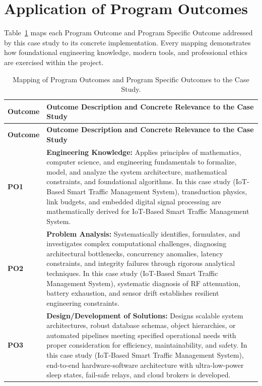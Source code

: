 \section{Application of Program Outcomes}
Table~\ref{tab:po} maps each Program Outcome and Program Specific Outcome addressed by this case study to its concrete implementation. Every mapping demonstrates how foundational engineering knowledge, modern tools, and professional ethics are exercised within the project.

{\small
\begin{longtable}{@{}>{\centering\arraybackslash}p{1.8cm} p{13.2cm}@{}}
    \caption{Mapping of Program Outcomes and Program Specific Outcomes to the Case Study.}\label{tab:po}\\
    \toprule
    \textbf{Outcome} & \textbf{Outcome Description and Concrete Relevance to the Case Study} \\
    \midrule
    \endfirsthead
    \toprule
    \textbf{Outcome} & \textbf{Outcome Description and Concrete Relevance to the Case Study} \\
    \midrule
    \endhead
\textbf{PO1} & \textbf{Engineering Knowledge:} Applies principles of mathematics, computer science, and engineering fundamentals to formalize, model, and analyze the system architecture, mathematical constraints, and foundational algorithms. In this case study (IoT-Based Smart Traffic Management System), transduction physics, link budgets, and embedded digital signal processing are mathematically derived for IoT-Based Smart Traffic Management System. \\
    \addlinespace
\textbf{PO2} & \textbf{Problem Analysis:} Systematically identifies, formulates, and investigates complex computational challenges, diagnosing architectural bottlenecks, concurrency anomalies, latency constraints, and integrity failures through rigorous analytical techniques. In this case study (IoT-Based Smart Traffic Management System), systematic diagnosis of RF attenuation, battery exhaustion, and sensor drift establishes resilient engineering constraints. \\
    \addlinespace
\textbf{PO3} & \textbf{Design/Development of Solutions:} Designs scalable system architectures, robust database schemas, object hierarchies, or automated pipelines meeting specified operational needs with proper consideration for efficiency, maintainability, and safety. In this case study (IoT-Based Smart Traffic Management System), end-to-end hardware-software architecture with ultra-low-power sleep states, fail-safe relays, and cloud brokers is developed. \\

\end{longtable}}
